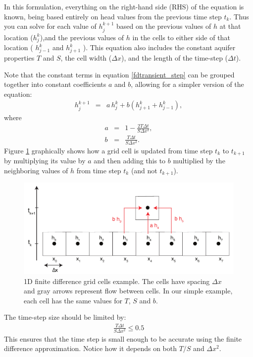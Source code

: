 \documentclass[11pt, oneside]{article}   	%
\begin{document}
In this formulation, everything on the right-hand side (RHS) of the equation is known, being based entirely on head values from the previous time step $t_k$. 
 Thus you can solve for each value of  $h_j^{k+1}$ based on the previous values of $h$ at that location ($h_j^{k}$),and  the previous values of $h$ in the cells to either side of that location ( $h_{j-1}^{k}$ and $h_{j+1}^{k}$ ).
 This equation also includes the constant aquifer properties $T$ and $S$, the cell width ($\Delta x$), and the length of the time-step ($\Delta t$). 

Note that  the constant terms in equation \ref{fdtransient_step} can be grouped together into constant coefficients $a$ and $b$,  allowing for a  simpler version of the equation:
\begin{eqnarray}
h_j^{k+1} &=&a\, h_j^{k}  + b \left( h_{j+1}^{k} + h_{j-1}^{k} \right),
\end{eqnarray}
where
\begin{eqnarray}
a&=&  1 - \frac{2T\Delta t}{S\Delta x^2}, \\
b &=&   \frac{T\Delta t}{S\Delta x^2}.
\end{eqnarray}
Figure \ref{grid_step} graphically shows how a grid cell is updated from time step $t_k$ to $t_{k+1}$ by multiplying its value by $a$ and then adding this to $b$ multiplied by the neighboring values of $h$ from time step $t_k$ (and not $t_{k+1}$).

\begin{figure}[htbp]
\begin{center}
\includegraphics[width=.9\textwidth]{grid_step.pdf}
\caption{1D finite difference grid cells example.  The cells have spacing $\Delta x$ and gray arrows represent flow between cells. In our simple example, each cell has the same values for $T$, $S$ and $b$.  }
\label{grid_step}
\end{center}
\end{figure}

The time-step size should be limited by:
\begin{eqnarray}
 \frac{T\Delta t}{S\Delta x^2} \le 0.5
\end{eqnarray}
This ensures that the time step is small enough to be accurate using the finite difference approximation. Notice how it depends on both $T/S$ and $\Delta x^2$.
\end{document}
